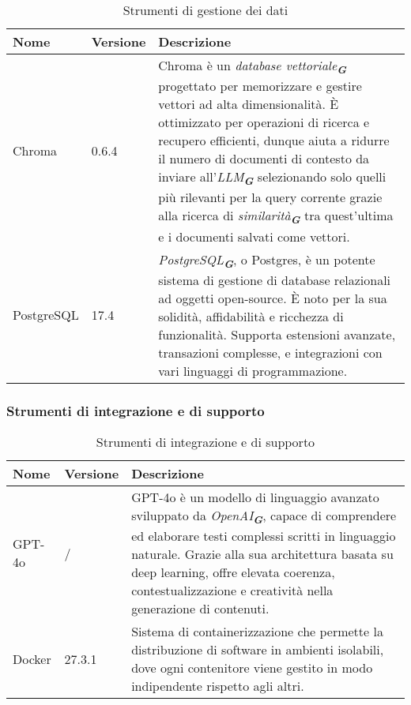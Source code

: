\begin{table}[h!]
    \centering
    \renewcommand{\arraystretch}{1.6} %
    \begin{tabularx}{\textwidth}{|p{2cm}|p{2cm}|X|} \hline
    \rowcolor[HTML]{FFD700} 
    \textbf{Nome} & \textbf{Versione} & \textbf{Descrizione} \\ 
    \hline
    Chroma & 0.6.4 & Chroma è un \emph{database vettoriale}\textsubscript{\textbf{\textit{G}}} progettato per memorizzare e
                    gestire vettori ad alta dimensionalità. 
                    È ottimizzato per operazioni di ricerca e recupero efficienti, dunque aiuta a ridurre il numero di documenti
                    di contesto da inviare all'\emph{LLM}\textsubscript{\textbf{\textit{G}}} selezionando solo quelli più rilevanti
                    per la query corrente grazie alla ricerca di \emph{similarità}\textsubscript{\textbf{\textit{G}}} tra 
                    quest'ultima e i documenti salvati come vettori. \\ \hline
    PostgreSQL & 17.4 & \emph{PostgreSQL}\textsubscript{\textbf{\textit{G}}}, o Postgres, è un potente sistema di gestione di
    database relazionali ad oggetti open-source. 
    È noto per la sua solidità, affidabilità e ricchezza di funzionalità. Supporta estensioni avanzate, transazioni complesse, e 
    integrazioni con vari linguaggi di programmazione. \\ \hline
    \end{tabularx}
    \caption{Strumenti di gestione dei dati}
\end{table}


\subsubsection{Strumenti di integrazione e di supporto}
\label{subsec:strumenti_integrazione_supporto}

\begin{table}[h!]
    \centering
    \renewcommand{\arraystretch}{1.6} %
    \begin{tabularx}{\textwidth}{|p{2cm}|p{2cm}|X|} \hline
    \rowcolor[HTML]{FFD700} 
    \textbf{Nome} & \textbf{Versione} & \textbf{Descrizione} \\ 
    \hline
    GPT-4o & / & GPT-4o è un modello di linguaggio avanzato sviluppato da \emph{OpenAI}\textsubscript{\textbf{\textit{G}}},
    capace di comprendere ed elaborare testi complessi scritti in linguaggio naturale. 
    Grazie alla sua architettura basata su deep learning, offre elevata coerenza, contestualizzazione e creatività nella generazione
    di contenuti. \\ \hline
    Docker & 27.3.1 & Sistema di containerizzazione che permette la distribuzione
    di software in ambienti isolabili, dove ogni contenitore
    viene gestito in modo indipendente rispetto agli altri. \\ \hline
    \end{tabularx}
    \caption{Strumenti di integrazione e di supporto}
\end{table}

